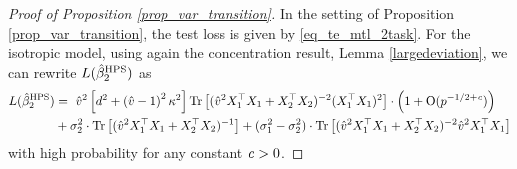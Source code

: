 \begin{proof}[Proof of Proposition \ref{prop_var_transition}]
In the setting of Proposition \ref{prop_var_transition}, the test loss is given by \eqref{eq_te_mtl_2task}.
For the isotropic model, using again the concentration result, Lemma \ref{largedeviation}, we can rewrite $L(\hat{\beta}_2^{\textup{HPS}})$ as
\begin{align*}
	L(\hat{\beta}_2^{\textup{HPS}}) &=~ \hat{v}^2 \left[d^2 +\left( \hat v-1\right)^2\kappa^2\right]\operatorname{Tr}\left[ (\hat{v}^2 X_1^{\top}X_1 + X_2^{\top}X_2)^{-2} (X_1^{\top}X_1)^2\right] \cdot \left(1+\operatorname{O}(p^{-1/2+{\mathit{c}}})\right)\nonumber \\
	& + \sigma_2^2 \cdot \operatorname{Tr}\left[(\hat{v}^2 X_1^{\top}X_1 + X_2^{\top}X_2)^{-1} \right] + (\sigma_1^2 -\sigma_2^2)  \cdot \operatorname{Tr}\left[(\hat{v}^2 X_1^{\top}X_1 + X_2^{\top}X_2)^{-2} \hat v^2X_1^\top X_1\right]
\end{align*}
with high probability for any constant ${\mathit{c}}>0$.




\end{proof}
